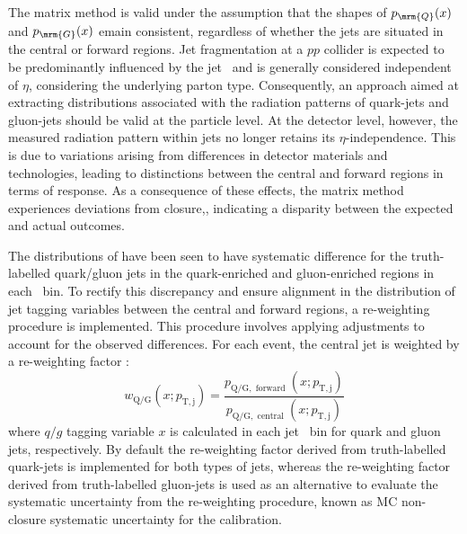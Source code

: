  
  The matrix method is valid under the assumption that the shapes of $p_{\mrm{Q}}(x)$ and $p_{\mrm{G}}(x)$ emain consistent, regardless of whether the jets are situated in the central or forward regions. Jet fragmentation at a $pp$ collider is expected to be predominantly influenced by the jet \pt~and is generally considered independent of $\eta$, considering the underlying parton type. Consequently, an approach aimed at extracting distributions associated with the radiation patterns of quark-jets and gluon-jets should be valid at the particle level. At the detector level, however, the measured radiation pattern within jets no longer retains its $\eta$-independence. This is due to variations arising from differences in detector materials and technologies, leading to distinctions between the central and forward regions in terms of response. As a consequence of these effects, the matrix method experiences deviations from closure,, indicating a disparity between the expected and actual outcomes.
  


The distributions of {\ntrk} have been seen to have systematic difference for the truth-labelled quark/gluon jets in the quark-enriched and gluon-enriched regions in each \pt~bin. To rectify this discrepancy and ensure alignment in the distribution of jet tagging variables between the central and forward regions, a re-weighting procedure is implemented. This procedure involves applying adjustments to account for the observed differences.  For each event, the central jet is weighted by a re-weighting factor :
\begin{equation}
w_{\mathrm{Q} / \mathrm{G}}\left(x ; p_{\mathrm{T}, \mathrm{j}}\right)=\frac{p_{\mathrm{Q} / \mathrm{G}, \text { forward }}\left(x ; p_{\mathrm{T}, \mathrm{j}}\right)}{p_{\mathrm{Q} / \mathrm{G}, \text { central }}\left(x ; p_{\mathrm{T}, \mathrm{j}}\right)}
\label{eq:QG-reweight}
\end{equation}
where $q/g$ tagging variable $x$ is calculated in each jet \pt~bin for quark and gluon jets, respectively. By default the re-weighting factor derived from truth-labelled quark-jets is implemented for both types of jets, whereas the re-weighting factor derived from truth-labelled gluon-jets is used as an alternative to evaluate the systematic uncertainty from the re-weighting procedure, known as MC non-closure systematic uncertainty for the calibration.



